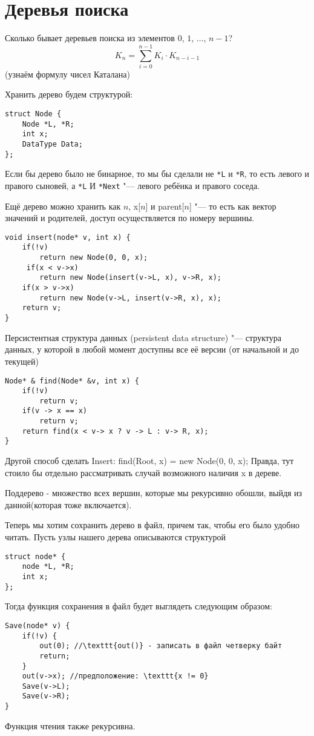 \section{Деревья поиска}
Сколько бывает деревьев поиска из элементов $0$, $1$, $\ldots$, $n - 1$?
\[K_{n} = \sum_{i = 0}^{n -1} K_{i} \cdot K_{n - i - 1} \]
(узнаём формулу чисел Каталана)

Хранить дерево будем структурой:
\begin{verbatim}
struct Node {
	Node *L, *R;
	int x;
	DataType Data;
};
\end{verbatim}

\Rem Если бы дерево было не бинарное, то мы бы сделали не \texttt{*L} и \texttt{*R}, то есть левого и правого сыновей, а \texttt{*L} И \texttt{*Next} "--- левого ребёнка и правого соседа.

\Rem Ещё дерево можно хранить как $n$, x[$n$]  и parent[$n$] "--- то есть как вектор значений и родителей, доступ осуществляется по номеру вершины.

\begin{verbatim}
void insert(node* v, int x) {
	if(!v)
		return new Node(0, 0, x);
	 if(x < v->x)
		return new Node(insert(v->L, x), v->R, x);
	if(x > v->x)
		return new Node(v->L, insert(v->R, x), x);
	return v;
}
\end{verbatim}

\Def Персистентная структура данных (persistent data structure) "--- структура данных, у которой в любой момент доступны все её версии (от начальной и до текущей)

\begin{verbatim}
Node* & find(Node* &v, int x) {
	if(!v)
		return v;
	if(v -> x == x)
		return v;
	return find(x < v-> x ? v -> L : v-> R, x);
}
\end{verbatim}

\Rem Другой способ сделать Insert: find(Root, x) = new Node(0, 0, x); Правда, тут стоило бы отдельно рассматривать случай возможного наличия x в дереве.

\Def Поддерево - множество всех вершин, которые мы рекурсивно обошли, выйдя из данной(которая тоже включается).

Теперь мы хотим сохранить дерево в файл, причем так, чтобы его было удобно читать. Пусть узлы нашего дерева описываются структурой
\begin{verbatim}
struct node* {
    node *L, *R;
    int x;
};
\end{verbatim}
Тогда функция сохранения в файл будет выглядеть следующим образом:
\begin{verbatim}
Save(node* v) {
    if(!v) {
        out(0); //\texttt{out()} - записать в файл четверку байт
        return;
    }
    out(v->x); //предположение: \texttt{x != 0}
    Save(v->L);
    Save(v->R);
}
\end{verbatim}
Функция чтения также рекурсивна.

